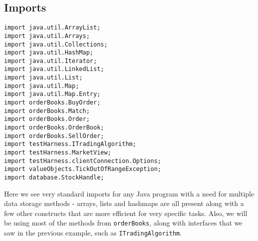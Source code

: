 \documentclass[11pt]{article}
\begin{document}
\subsection{Imports}
\begin{lstlisting}
import java.util.ArrayList;
import java.util.Arrays;
import java.util.Collections;
import java.util.HashMap;
import java.util.Iterator;
import java.util.LinkedList;
import java.util.List;
import java.util.Map;
import java.util.Map.Entry;
import orderBooks.BuyOrder;
import orderBooks.Match;
import orderBooks.Order;
import orderBooks.OrderBook;
import orderBooks.SellOrder;
import testHarness.ITradingAlgorithm;
import testHarness.MarketView;
import testHarness.clientConnection.Options;
import valueObjects.TickOutOfRangeException;
import database.StockHandle;
\end{lstlisting}
\endgroup
Here we see very standard imports for any Java program with a need for multiple data storage methods - arrays, lists and hashmaps are all present along with a few other constructs that are more efficient for very specific tasks. Also, we will be using most of the methods from \texttt{orderBooks}, along with interfaces that we saw in the previous example, such as \texttt{ITradingAlgorithm}.
\end{document}
